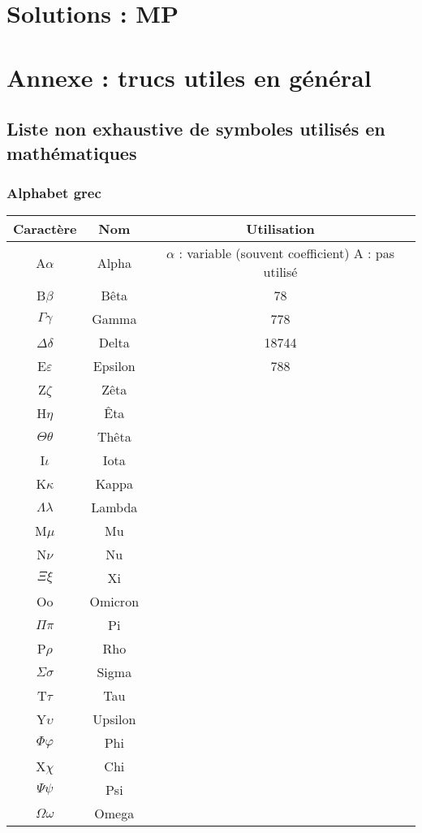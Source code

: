\documentclass[12pt,a4paper]{exo_book}
\begin{document}
\part{Solutions : MP}

\appendix

\part{Annexe : trucs utiles en général}


\chapter{Liste non exhaustive de symboles utilisés en mathématiques}

\section{Alphabet grec}

\begin{longtable}{| c | c | c |} 
 \hline
 Caractère & Nom & Utilisation \\
 \hline\hline
 \endhead
 A$\alpha$ & Alpha & \makecell[l]{$\alpha$ : variable (souvent coefficient) \\ A : pas utilisé} \\ \hline
 B$\beta$ & Bêta & 78 \\ \hline
 $\Gamma\gamma$ & Gamma & 778\\ \hline
 $\Delta\delta$ & Delta & 18744 \\ \hline
 E$\varepsilon$ & Epsilon & 788 \\ \hline
 Z$\zeta$ & Zêta & \\ \hline
 H$\eta$ &  Êta & \\ \hline
 $\Theta\theta$ & Thêta & \\ \hline
 I$\iota$ & Iota & \\ \hline
 K$\kappa$ & Kappa & \\ \hline
 $\Lambda\lambda$ & Lambda & \\ \hline
 M$\mu$ & Mu & \\ \hline
 N$\nu$ & Nu & \\ \hline
 $\Xi\xi$ & Xi & \\ \hline
 Oo & Omicron& \\\hline 
 $\Pi\pi$ & Pi & \\ \hline
 P$\rho$ & Rho & \\ \hline
 $\Sigma\sigma$ & Sigma & \\ \hline
 T$\tau$ & Tau & \\ \hline
 Y$\upsilon$ & Upsilon & \\ \hline
 $\Phi\varphi$ & Phi & \\ \hline
 X$\chi$ & Chi & \\ \hline
 $\Psi\psi$ & Psi & \\ \hline
 $\Omega\omega$ & Omega & \\ \hline
 
\end{longtable}
\end{document}
